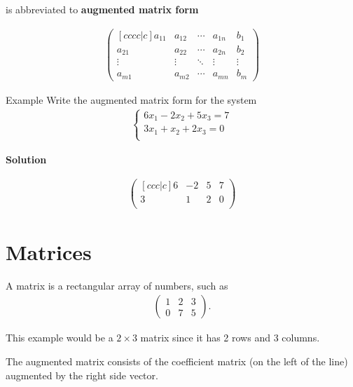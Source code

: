 \documentclass{report}
\begin{document}
		is abbreviated to \textbf{augmented matrix form}

		\begin{align*}
			\begin{pmatrix}[cccc|c]
				a_{11} & a_{12} & \cdots & a_{1n} & b_1	\\
				a_{21} & a_{22} & \cdots & a_{2n} & b_2	\\
				\vdots & \vdots & \ddots & \vdots & \vdots	\\
				a_{m1} & a_{m2} & \cdots & a_{mn} & b_m
			\end{pmatrix}
		\end{align*}

		\begin{question}{Example}
			Write the augmented matrix form for the system
			\begin{align*}
				\begin{cases}
					6x_1 - 2x_2 + 5x_3 = 7	\\
					3x_1 + x_2 + 2x_3 = 0	\\
				\end{cases}
			\end{align*}

			\textbf{Solution}
				
			\begin{align*}
				\begin{pmatrix}[ccc|c]
					6 & -2 & 5 & 7	\\
					3 & 1 & 2 & 0	\\
				\end{pmatrix}
			\end{align*}
		\end{question}

	\section{Matrices}

		A matrix is a rectangular array of numbers, such as
			\begin{align*}
				\begin{pmatrix}
					1 & 2 & 3	\\
					0 & 7 & 5
				\end{pmatrix}.
			\end{align*}

		This example would be a $2 \times 3$ matrix since it has 2 rows and 3 columns.

		The augmented matrix consists of the coefficient matrix (on the left of the line) augmented by the right side vector.
\end{document}
